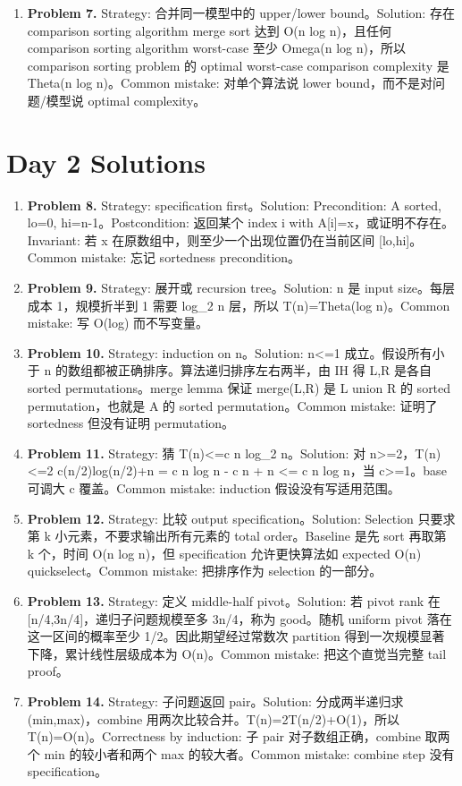 \documentclass[11pt]{ctexart}
\begin{document}
\begin{enumerate}
  \item \textbf{Problem 7.} Strategy: 合并同一模型中的 upper/lower bound。Solution: 存在 comparison sorting algorithm merge sort 达到 O(n log n)，且任何 comparison sorting algorithm worst-case 至少 Omega(n log n)，所以 comparison sorting problem 的 optimal worst-case comparison complexity 是 Theta(n log n)。Common mistake: 对单个算法说 lower bound，而不是对问题/模型说 optimal complexity。
\end{enumerate}

\section{Day 2 Solutions}
\begin{enumerate}
  \item \textbf{Problem 8.} Strategy: specification first。Solution: Precondition: A sorted, lo=0, hi=n-1。Postcondition: 返回某个 index i with A[i]=x，或证明不存在。Invariant: 若 x 在原数组中，则至少一个出现位置仍在当前区间 [lo,hi]。Common mistake: 忘记 sortedness precondition。
  \item \textbf{Problem 9.} Strategy: 展开或 recursion tree。Solution: n 是 input size。每层成本 1，规模折半到 1 需要 log\_2 n 层，所以 T(n)=Theta(log n)。Common mistake: 写 O(log) 而不写变量。
  \item \textbf{Problem 10.} Strategy: induction on n。Solution: n<=1 成立。假设所有小于 n 的数组都被正确排序。算法递归排序左右两半，由 IH 得 L,R 是各自 sorted permutations。merge lemma 保证 merge(L,R) 是 L union R 的 sorted permutation，也就是 A 的 sorted permutation。Common mistake: 证明了 sortedness 但没有证明 permutation。
  \item \textbf{Problem 11.} Strategy: 猜 T(n)<=c n log\_2 n。Solution: 对 n>=2，T(n)<=2 c(n/2)log(n/2)+n = c n log n - c n + n <= c n log n，当 c>=1。base 可调大 c 覆盖。Common mistake: induction 假设没有写适用范围。
  \item \textbf{Problem 12.} Strategy: 比较 output specification。Solution: Selection 只要求第 k 小元素，不要求输出所有元素的 total order。Baseline 是先 sort 再取第 k 个，时间 O(n log n)，但 specification 允许更快算法如 expected O(n) quickselect。Common mistake: 把排序作为 selection 的一部分。
  \item \textbf{Problem 13.} Strategy: 定义 middle-half pivot。Solution: 若 pivot rank 在 [n/4,3n/4]，递归子问题规模至多 3n/4，称为 good。随机 uniform pivot 落在这一区间的概率至少 1/2。因此期望经过常数次 partition 得到一次规模显著下降，累计线性层级成本为 O(n)。Common mistake: 把这个直觉当完整 tail proof。
  \item \textbf{Problem 14.} Strategy: 子问题返回 pair。Solution: 分成两半递归求 (min,max)，combine 用两次比较合并。T(n)=2T(n/2)+O(1)，所以 T(n)=O(n)。Correctness by induction: 子 pair 对子数组正确，combine 取两个 min 的较小者和两个 max 的较大者。Common mistake: combine step 没有 specification。
\end{enumerate}
\end{document}
